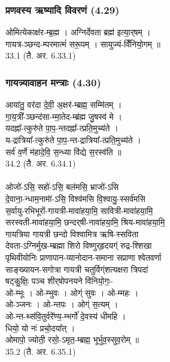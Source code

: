 \subsubsection{प्रणवस्य ऋष्यादि विवरणं (4.29)}
ओमित्येकाक्ष॑र-म्ब्र॒ह्म । अग्निर्देवता ब्रह्म॑ इत्या॒र्​षम् ।\\
गायत्र-ञ्छन्द-म्परमात्मं॑ सरू॒पम् । सायुज्यं-विँ॑नियो॒गम् ॥ \\
33.1 (तै. अर. 6.33.1)\\

\subsubsection{गायत्र्यावाहन मन्त्राः (4.30)}
आया॑तु॒ वर॑दा दे॒वी॒ अ॒क्षर॑-म्ब्रह्म॒ सम्मि॑तम् ।\\
गा॒य॒त्री᳚-ञ्छन्द॑सा-म्मा॒तेद-म्ब्र॑ह्म जु॒षस्व॑ मे ।\\
यदह्ना᳚-त्कुरु॑ते पा॒प॒-न्तदह्ना᳚-त्प्रति॒मुच्य॑ते ।\\
य-द्रात्रिया᳚-त्कुरु॑ते पा॒प॒-न्त-द्रात्रिया᳚-त्प्रति॒मुच्य॑ते ।\\
सर्व॑ व॒र्णे म॑हादे॒वि॒ स॒न्ध्या वि॑द्ये स॒रस्व॑ति ॥ \\
34.2 (तै. अर. 6.34.1)\\
\\
ओजो॑-ऽसि॒ सहो॑-ऽसि॒ बल॑मसि॒ भ्राजो॑-ऽसि \\
दे॒वाना॒-न्धाम॒नामा॑॑-ऽसि॒ विश्व॑मसि वि॒श्वायु॒-स्सर्व॑मसि \\
स॒र्वायु-रभिभूरों-गायत्री-मावा॑हया॒मि॒ सावित्री-मावा॑हया॒मि॒ \\
सरस्वती-मावा॑हया॒मि॒ छन्दर्​षी-नावा॑हया॒मि॒ श्रिय-मावा॑हया॒मि॒ \\
गायत्रिया गायत्री छन्दो विश्वामित्र ऋषि-स्सविता \\
देवता-ऽग्निर्मुख-म्ब्रह्मा शिरो विष्णुर्​हृदयग्ं रुद्र-श्शिखा \\
पृथिवीयोनिः प्राणापान-व्यानोदान-समाना सप्राणा श्वेतवर्णा \\
साङ्ख्यायन-सगोत्रा गायत्री चतुर्विग्ंशत्यक्षरा त्रिपदा॑ \\
षट्कु॒क्षिः॒ पञ्च शीर्​षोपनयने वि॑नियो॒गः॒-\\
ओ-म्भूः । ओ-म्भुवः । ओग्ं सुवः । ओ-म्महः । \\
ओ-ञ्जनः । ओ-न्तपः । ओग्ं स॒त्यम् । \\
ओ-न्त-थ्स॑वि॒तुर्वरे᳚ण्य॒-म्भर्गो॑ दे॒वस्य॑ धीमहि । \\
धियो॒ यो नः॑ प्रचो॒दया᳚त् । \\
ओमापो॒ ज्योती॒ रसो॒-ऽमृत॒-म्ब्रह्म॒ भूर्भुव॒स्सुव॒रोम् ॥ \\
35.2 (तै. अर. 6.35.1)\\


